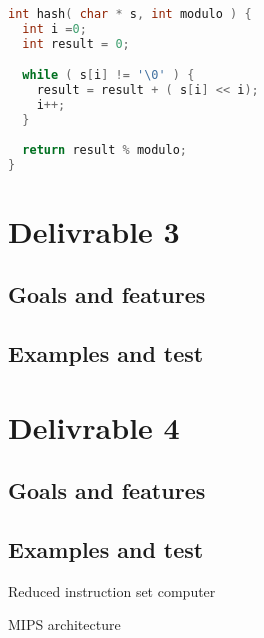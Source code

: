 \documentclass[twoside,twocolumn]{article}
\begin{document}
\begin{lstlisting}[language=C]
int hash( char * s, int modulo ) {
  int i =0;
  int result = 0;

  while ( s[i] != '\0' ) {
    result = result + ( s[i] << i);
    i++;
  }
  
  return result % modulo;
}
\end{lstlisting}




\section{Delivrable 3}

\subsection{Goals and features}

\subsection{Examples and test}


\section{Delivrable 4}

\subsection{Goals and features}

\subsection{Examples and test}



\begin{thebibliography}{99} %


\newblock Reduced instruction set computer

\newblock MIPS architecture

\newblock 

\end{thebibliography}
\end{document}
